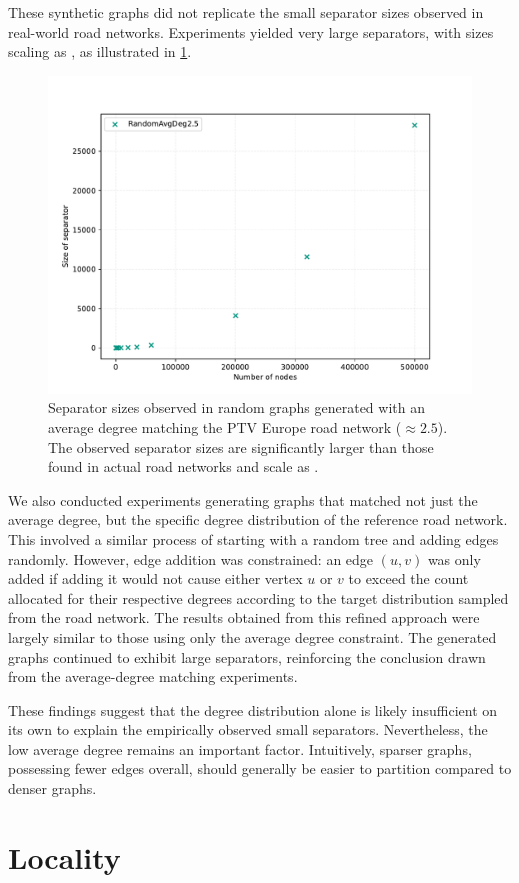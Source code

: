 These synthetic graphs did not replicate the small separator sizes observed in real-world road networks.
Experiments yielded very large separators, with sizes scaling as , as illustrated in \cref{fig:same_degree}.

\begin{figure}
	\centering
	\includegraphics[width=0.6\linewidth]{graphics/RandomAvgDeg2.5.pdf}
	\caption{Separator sizes observed in random graphs generated with an average degree matching the PTV Europe road network (\( \approx 2.5 \)). The observed separator sizes are significantly larger than those found in actual road networks and scale as .}
	\label{fig:same_degree}
\end{figure}

We also conducted experiments generating graphs that matched not just the average degree, but the specific degree distribution of the reference road network.
This involved a similar process of starting with a random tree and adding edges randomly.
However, edge addition was constrained: an edge \( (u, v) \) was only added if adding it would not cause either vertex \(u\) or \(v\) to exceed the count allocated for their respective degrees according to the target distribution sampled from the road network.
The results obtained from this refined approach were largely similar to those using only the average degree constraint.
The generated graphs continued to exhibit large separators, reinforcing the conclusion drawn from the average-degree matching experiments.

These findings suggest that the degree distribution alone is likely insufficient on its own to explain the empirically observed small separators.
Nevertheless, the low average degree remains an important factor.
Intuitively, sparser graphs, possessing fewer edges overall, should generally be easier to partition compared to denser graphs.

\section{Locality}
\label{sec:synthetic:locality}


